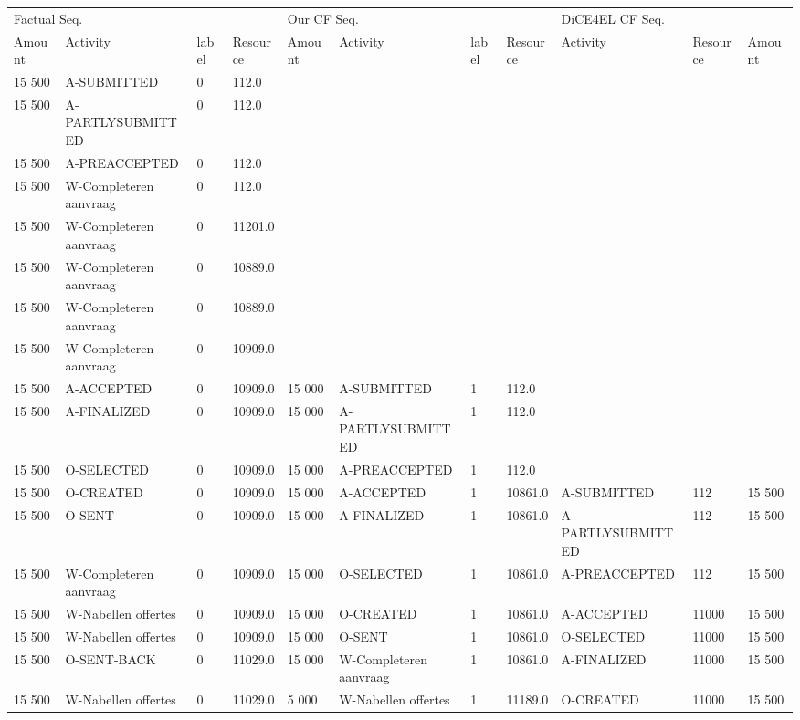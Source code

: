 \begin{tabular}{lllllllllll}
\toprule
\multicolumn{4}{l}{Factual Seq.} & \multicolumn{4}{l}{Our CF Seq.} & \multicolumn{3}{l}{DiCE4EL CF Seq.} \\
Amount & Activity & label & Resource & Amount & Activity & label & Resource & Activity & Resource & Amount \\
\midrule
15 500 & A-SUBMITTED & 0 & 112.0 &  &  &  &  &  &  &  \\
15 500 & A-PARTLYSUBMITTED & 0 & 112.0 &  &  &  &  &  &  &  \\
15 500 & A-PREACCEPTED & 0 & 112.0 &  &  &  &  &  &  &  \\
15 500 & W-Completeren aanvraag & 0 & 112.0 &  &  &  &  &  &  &  \\
15 500 & W-Completeren aanvraag & 0 & 11201.0 &  &  &  &  &  &  &  \\
15 500 & W-Completeren aanvraag & 0 & 10889.0 &  &  &  &  &  &  &  \\
15 500 & W-Completeren aanvraag & 0 & 10889.0 &  &  &  &  &  &  &  \\
15 500 & W-Completeren aanvraag & 0 & 10909.0 &  &  &  &  &  &  &  \\
15 500 & A-ACCEPTED & 0 & 10909.0 & 15 000 & A-SUBMITTED & 1 & 112.0 &  &  &  \\
15 500 & A-FINALIZED & 0 & 10909.0 & 15 000 & A-PARTLYSUBMITTED & 1 & 112.0 &  &  &  \\
15 500 & O-SELECTED & 0 & 10909.0 & 15 000 & A-PREACCEPTED & 1 & 112.0 &  &  &  \\
15 500 & O-CREATED & 0 & 10909.0 & 15 000 & A-ACCEPTED & 1 & 10861.0 & A-SUBMITTED & 112 & 15 500 \\
15 500 & O-SENT & 0 & 10909.0 & 15 000 & A-FINALIZED & 1 & 10861.0 & A-PARTLYSUBMITTED & 112 & 15 500 \\
15 500 & W-Completeren aanvraag & 0 & 10909.0 & 15 000 & O-SELECTED & 1 & 10861.0 & A-PREACCEPTED & 112 & 15 500 \\
15 500 & W-Nabellen offertes & 0 & 10909.0 & 15 000 & O-CREATED & 1 & 10861.0 & A-ACCEPTED & 11000 & 15 500 \\
15 500 & W-Nabellen offertes & 0 & 10909.0 & 15 000 & O-SENT & 1 & 10861.0 & O-SELECTED & 11000 & 15 500 \\
15 500 & O-SENT-BACK & 0 & 11029.0 & 15 000 & W-Completeren aanvraag & 1 & 10861.0 & A-FINALIZED & 11000 & 15 500 \\
15 500 & W-Nabellen offertes & 0 & 11029.0 & 5 000 & W-Nabellen offertes & 1 & 11189.0 & O-CREATED & 11000 & 15 500 \\

\end{tabular}
